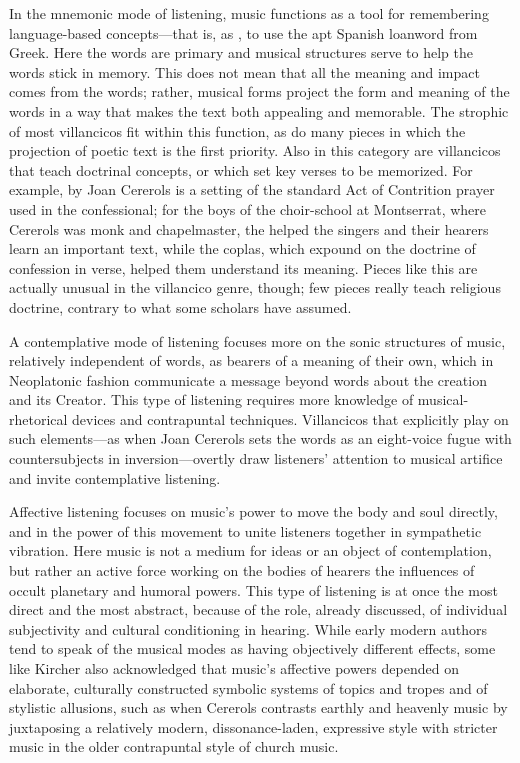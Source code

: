 \documentclass[tt]{vcbook-proposal}
\begin{document}
In the mnemonic mode of listening, music functions as a tool for remembering language-based concepts---that is, as , to use the apt Spanish loanword from Greek.
Here the words are primary and musical structures serve to help the words stick in memory.
This does not mean that all the meaning and impact comes from the words; rather, musical forms project the form and meaning of the words in a way that makes the text both appealing and memorable.
The strophic  of most villancicos fit within this function, as do many pieces in which the projection of poetic text is the first priority.
Also in this category are villancicos that teach doctrinal concepts, or which set key verses to be memorized.
For example,  by Joan Cererols is a setting of the standard Act of Contrition prayer used in the confessional; for the boys of the choir-school at Montserrat, where Cererols was monk and chapelmaster, the  helped the singers and their hearers learn an important text, while the coplas, which expound on the doctrine of confession in verse, helped them understand its meaning.
Pieces like this are actually unusual in the villancico genre, though; few pieces really teach religious doctrine, contrary to what some scholars have assumed.

A contemplative mode of listening focuses more on the sonic structures of  music, relatively independent of words, as bearers of a meaning of their own, which in Neoplatonic fashion communicate a message beyond words about the creation and its Creator.
This type of listening requires more knowledge of musical-rhetorical devices and contrapuntal techniques. 
Villancicos that explicitly play on such elements---as when Joan Cererols sets the words  as an eight-voice fugue with countersubjects in inversion---overtly draw listeners' attention to musical artifice and invite contemplative listening.

Affective listening focuses on music's power to move the body and soul directly, and in the power of this movement to unite listeners together in sympathetic vibration.
Here music is not a medium for ideas or an object of contemplation, but rather an active force working on the bodies of hearers the influences of occult planetary and humoral powers.
This type of listening is at once the most direct and the most abstract, because of the role, already discussed, of individual subjectivity and cultural conditioning in hearing.
While early modern authors tend to speak of the musical modes as having objectively different effects, some like Kircher also acknowledged that music's affective powers depended on elaborate, culturally constructed symbolic systems of topics and tropes and of stylistic allusions, such as when Cererols contrasts earthly and heavenly music by juxtaposing a relatively modern, dissonance-laden, expressive style with stricter music in the older contrapuntal style of church music.
\end{document}

